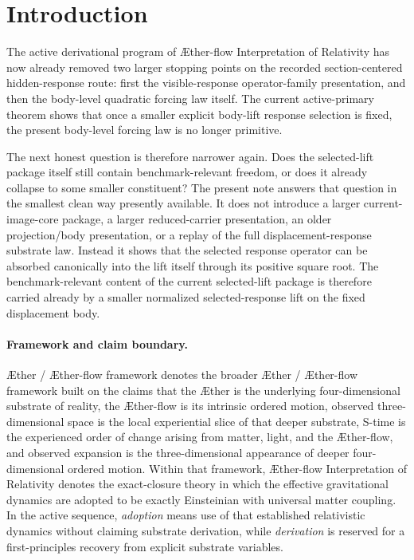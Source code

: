 \documentclass[11pt]{article}
\newcommand{\Aether}{\AE{}ther}
\newcommand{\Aflow}{\AE{}ther-flow}
\newcommand{\TheoryName}{\Aflow{} Interpretation of Relativity}
\newcommand{\TheoryProgram}{\Aether{} / \Aflow{} framework}
\begin{document}
\section{Introduction}

The active derivational program of \TheoryName{} has now already removed two larger stopping points on the recorded section-centered hidden-response route: first the visible-response operator-family presentation, and then the body-level quadratic forcing law itself. The current active-primary theorem shows that once a smaller explicit body-lift response selection is fixed, the present body-level forcing law is no longer primitive.

The next honest question is therefore narrower again. Does the selected-lift package itself still contain benchmark-relevant freedom, or does it already collapse to some smaller constituent? The present note answers that question in the smallest clean way presently available. It does not introduce a larger current-image-core package, a larger reduced-carrier presentation, an older projection/body presentation, or a replay of the full displacement-response substrate law. Instead it shows that the selected response operator can be absorbed canonically into the lift itself through its positive square root. The benchmark-relevant content of the current selected-lift package is therefore carried already by a smaller normalized selected-response lift on the fixed displacement body.

\paragraph{Framework and claim boundary.}
\TheoryProgram{} denotes the broader \Aether{} / \Aflow{} framework built on the claims that the \Aether{} is the underlying four-dimensional substrate of reality, the \Aflow{} is its intrinsic ordered motion, observed three-dimensional space is the local experiential slice of that deeper substrate, S-time is the experienced order of change arising from matter, light, and the \Aflow{}, and observed expansion is the three-dimensional appearance of deeper four-dimensional ordered motion. Within that framework, \TheoryName{} denotes the exact-closure theory in which the effective gravitational dynamics are adopted to be exactly Einsteinian with universal matter coupling. In the active sequence, \emph{adoption} means use of that established relativistic dynamics without claiming substrate derivation, while \emph{derivation} is reserved for a first-principles recovery from explicit substrate variables.
\end{document}
